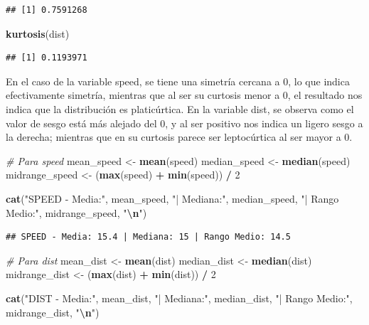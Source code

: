 \documentclass[
]{article}
\newenvironment{Shaded}{\begin{snugshade}}{\end{snugshade}}
\newcommand{\CommentTok}[1]{\textcolor[rgb]{0.56,0.35,0.01}{\textit{#1}}}
\newcommand{\DecValTok}[1]{\textcolor[rgb]{0.00,0.00,0.81}{#1}}
\newcommand{\FunctionTok}[1]{\textcolor[rgb]{0.13,0.29,0.53}{\textbf{#1}}}
\newcommand{\NormalTok}[1]{#1}
\newcommand{\OtherTok}[1]{\textcolor[rgb]{0.56,0.35,0.01}{#1}}
\newcommand{\SpecialCharTok}[1]{\textcolor[rgb]{0.81,0.36,0.00}{\textbf{#1}}}
\newcommand{\StringTok}[1]{\textcolor[rgb]{0.31,0.60,0.02}{#1}}
\begin{document}
\begin{verbatim}
## [1] 0.7591268
\end{verbatim}

\begin{Shaded}
\begin{Highlighting}[]
\FunctionTok{kurtosis}\NormalTok{(dist)}
\end{Highlighting}
\end{Shaded}

\begin{verbatim}
## [1] 0.1193971
\end{verbatim}

En el caso de la variable speed, se tiene una simetría cercana a 0, lo
que indica efectivamente simetría, mientras que al ser su curtosis menor
a 0, el resultado nos indica que la distribución es platicúrtica. En la
variable dist, se observa como el valor de sesgo está más alejado del 0,
y al ser positivo nos indica un ligero sesgo a la derecha; mientras que
en su curtosis parece ser leptocúrtica al ser mayor a 0.

\begin{Shaded}
\begin{Highlighting}[]
\CommentTok{\# Para \textquotesingle{}speed\textquotesingle{}}
\NormalTok{mean\_speed }\OtherTok{\textless{}{-}} \FunctionTok{mean}\NormalTok{(speed)}
\NormalTok{median\_speed }\OtherTok{\textless{}{-}} \FunctionTok{median}\NormalTok{(speed)}
\NormalTok{midrange\_speed }\OtherTok{\textless{}{-}}\NormalTok{ (}\FunctionTok{max}\NormalTok{(speed) }\SpecialCharTok{+} \FunctionTok{min}\NormalTok{(speed)) }\SpecialCharTok{/} \DecValTok{2}

\FunctionTok{cat}\NormalTok{(}\StringTok{"SPEED {-} Media:"}\NormalTok{, mean\_speed, }\StringTok{"| Mediana:"}\NormalTok{, median\_speed, }\StringTok{"| Rango Medio:"}\NormalTok{, midrange\_speed, }\StringTok{"}\SpecialCharTok{\textbackslash{}n}\StringTok{"}\NormalTok{)}
\end{Highlighting}
\end{Shaded}

\begin{verbatim}
## SPEED - Media: 15.4 | Mediana: 15 | Rango Medio: 14.5
\end{verbatim}

\begin{Shaded}
\begin{Highlighting}[]
\CommentTok{\# Para \textquotesingle{}dist\textquotesingle{}}
\NormalTok{mean\_dist }\OtherTok{\textless{}{-}} \FunctionTok{mean}\NormalTok{(dist)}
\NormalTok{median\_dist }\OtherTok{\textless{}{-}} \FunctionTok{median}\NormalTok{(dist)}
\NormalTok{midrange\_dist }\OtherTok{\textless{}{-}}\NormalTok{ (}\FunctionTok{max}\NormalTok{(dist) }\SpecialCharTok{+} \FunctionTok{min}\NormalTok{(dist)) }\SpecialCharTok{/} \DecValTok{2}

\FunctionTok{cat}\NormalTok{(}\StringTok{"DIST {-} Media:"}\NormalTok{, mean\_dist, }\StringTok{"| Mediana:"}\NormalTok{, median\_dist, }\StringTok{"| Rango Medio:"}\NormalTok{, midrange\_dist, }\StringTok{"}\SpecialCharTok{\textbackslash{}n}\StringTok{"}\NormalTok{)}
\end{Highlighting}
\end{Shaded}
\end{document}
